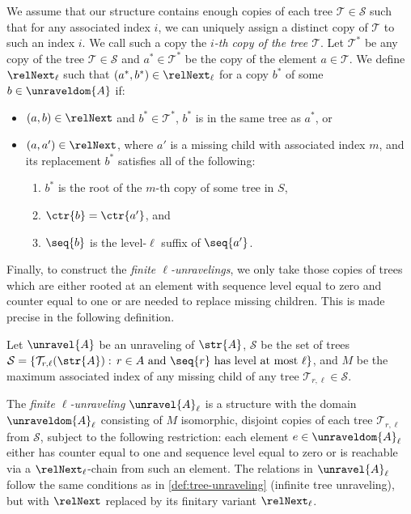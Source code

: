 We assume that our structure contains enough copies of each tree $\mathcal{T} \in \mathcal{S}$ such that for any associated index $i$, we can uniquely assign a distinct copy of $\mathcal{T}$ to such an index $i$.
We call such a copy the \emph{$i$-th copy of the tree $\mathcal{T}$}.
Let $\mathcal{T}^{*}$ be any copy of the tree $\mathcal{T} \in \mathcal{S}$ and $a^{*} \in \mathcal{T}^{*}$ be the copy of the element $a \in \mathcal{T}$.
We define $\relNext_{\ell}$ such that $(a^{*}, b^{*}) \in \relNext_{\ell}$ for a copy $b^{*}$ of some $b \in \unraveldom{A}$ if:
  \begin{itemize}
    \item $(a,b) \in \relNext$ and $b^{*} \in \mathcal{T}^{*}$, \ie{} $b^{*}$ is in the same tree as $a^{*}$, or
    \item
          $(a,a') \in \relNext$, where $a'$ is a missing child with associated index $m$, and its replacement $b^{*}$ satisfies all of the following:
          \begin{enumerate}
            \item $b^{*}$ is the root of the $m$-th copy of some tree in $S$,
            \item $\ctr{b} = \ctr{a'}$, and
            \item $\seq{b}$ is the level-$\ell$ suffix of $\seq{a'}$.
          \end{enumerate}
  \end{itemize}

Finally, to construct the \emph{finite $\ell$-unravelings}, we only take those copies of trees which are either rooted at an element with sequence level equal to zero and counter equal to one or are needed to replace missing children.
This is made precise in the following definition.
\begin{definition}\label{def:finite-tree-unraveling}
  Let $\unravel{A}$ be an unraveling of $\str{A}$, $\mathcal{S}$ be the set of trees $\mathcal{S} = \left\{ \mathcal{T}_{r,\ell}(\str{A}):\, r \in A \text{ and } \seq{r}\ \text{has level at most $\ell$}\right\}$, and
  $M$ be the maximum associated index of any missing child of any tree $\mathcal{T}_{r,\ell} \in \mathcal{S}$.

  The \emph{finite $\ell$-unraveling} $\unravel{A}_{\ell}$ is a structure with the domain $\unraveldom{A}_{\ell}$ consisting of $M$ isomorphic, disjoint copies of each tree $\mathcal{T}_{r,\ell}$ from $\mathcal{S}$, subject to the following restriction: each element $e \in \unraveldom{A}_{\ell}$ either has counter equal to one and sequence level equal to zero or is reachable via a $\relNext_{\ell}$-chain from such an element.
  The relations in $\unravel{A}_{\ell}$ follow the same conditions as in \cref{def:tree-unraveling} (infinite tree unraveling), but with $\relNext$ replaced by its finitary variant $\relNext_{\ell}$.
\end{definition}

